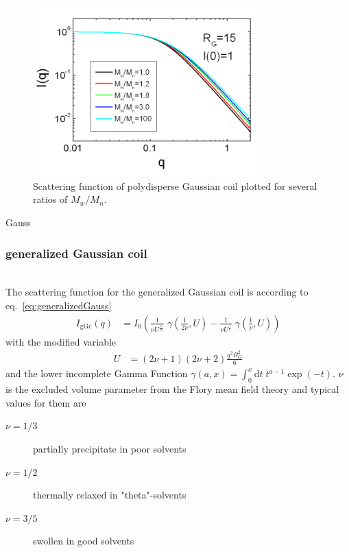 \begin{figure}[htb]
\begin{center}
\includegraphics[width=0.768\textwidth]{gauss_poly.png}
\end{center}
\caption{Scattering function of polydisperse Gaussian coil plotted for several ratios of $M_w/M_n$.}
\label{fig:I_gauss_poly}
\end{figure}

\textcolor[rgb]{1.00,1.00,1.00}{Gauss}\\
\subsubsection{generalized Gaussian coil} \cite{Hammouda,Hammouda2012,Hammouda1993,Hammouda2016}
\label{sect:generalized_gaussian_coil}
~\\
The scattering function for the generalized Gaussian coil is according to eq.\ \ref{eq:generalizedGauss}
\begin{align}
I_\text{gGc}(q) &= I_0
\left(
\frac{1}{\nu U^{\frac{1}{2 \nu}}} \; \gamma\left(\frac{1}{2 \nu},U\right)-
\frac{1}{\nu U^{\frac{1}{  \nu}}} \; \gamma\left(\frac{1}{  \nu},U\right)
\right)
\label{eq:generalizedGauss1}
\end{align}
with the modified variable
\begin{align}
U&= \left(2\nu+1\right)\left(2\nu+2\right)\frac{q^2R_G^2}{6}
\end{align}
and the lower incomplete Gamma Function $\gamma(a,x) = \int_0^x \mathrm{d}t \; t^{a-1} \exp(-t)$.
$\nu$ is the excluded volume parameter from the Flory mean field theory and typical values for them are
\begin{description}
\item[$\nu=1/3$] partially precipitate in poor solvents
\item[$\nu=1/2$] thermally relaxed in "theta"-solvents
\item[$\nu=3/5$] swollen in good solvents
\end{description}

